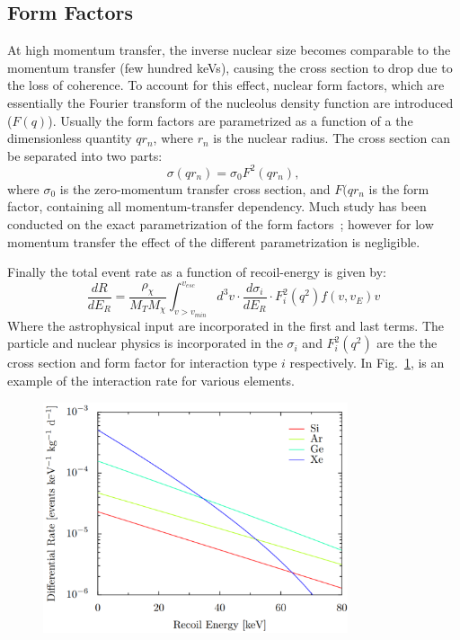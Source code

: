 \subsection{Form Factors}

At high momentum transfer, the inverse nuclear size becomes comparable to the momentum transfer (few hundred keVs), causing the cross section to drop due to the loss of coherence. To account for this effect, nuclear form factors, which are essentially the Fourier transform of the nucleolus density function are introduced ($F(q)$). Usually the form factors are parametrized as a function of a the dimensionless quantity $qr_n$, where $r_n$ is the nuclear radius. The cross section can be separated into two parts:
\begin{equation}
\sigma(qr_n) = \sigma_0F^2(qr_n),
\end{equation}
where $\sigma_0$ is the zero-momentum transfer cross section, and $F(qr_n$ is the form factor, containing all momentum-transfer dependency. Much study has been conducted on the exact parametrization of the form factors~\cite{Feldstein:2009tr}; however for low momentum transfer the effect of the different parametrization is negligible. 

Finally the total event rate as a function of recoil-energy is given by:
\begin{equation}
\frac{dR}{dE_R} = \frac{\rho_\chi}{M_TM_\chi}\int_{v>v_{min}}^{v_{esc}}d^3v\cdot \frac{d\sigma_i}{dE_R}\cdot F_i^2(q^2)f(v,v_E)v
\end{equation} 
Where the astrophysical input are incorporated in the first and last terms. The particle and nuclear physics is incorporated in the $\sigma_i$ and $F^2_i(q^2)$ are the the cross section and form factor for interaction type $i$ respectively. In Fig.~\ref{fig:interactionRate}, is an example of the interaction rate for various elements.

\begin{figure}[t!]
	\centering
	\includegraphics[width=0.8\textwidth]{figs/EventRate.png}
	\label{fig:interactionRate}
\end{figure}

